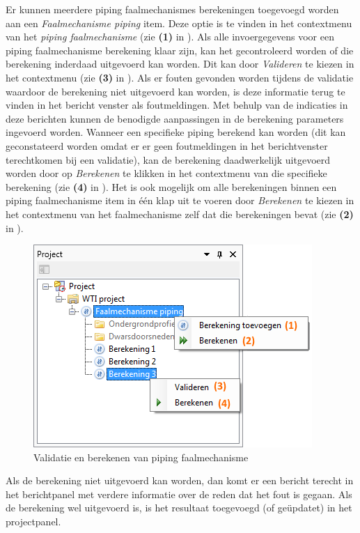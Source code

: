 \begin{enumerate}
\end{enumerate}


Er kunnen meerdere piping faalmechanismes berekeningen toegevoegd worden aan een \textit{Faalmechanisme piping} item. Deze optie is te vinden in het contextmenu van het \textit{piping faalmechanisme} (zie \textbf{(1)} in ).
Als alle invoergegevens voor een piping faalmechanisme berekening klaar zijn, kan het gecontroleerd worden of die berekening inderdaad uitgevoerd kan worden. Dit kan door \textit{Valideren} te kiezen in het contextmenu (zie \textbf{(3)} in ). Als er fouten gevonden worden tijdens de validatie waardoor de berekening niet uitgevoerd kan worden, is deze informatie terug te vinden in het bericht venster als foutmeldingen. Met behulp van de indicaties in deze berichten kunnen de benodigde aanpassingen in de berekening parameters ingevoerd worden. 
Wanneer een specifieke piping berekend kan worden (dit kan geconstateerd worden omdat er er geen foutmeldingen in het berichtvenster terechtkomen bij een validatie), kan de berekening daadwerkelijk uitgevoerd worden door op \textit{Berekenen} te klikken in het contextmenu van die specifieke berekening (zie \textbf{(4)} in ).
Het is ook mogelijk om alle berekeningen binnen een piping faalmechanisme item in één klap uit te voeren door \textit{Berekenen} te kiezen in het contextmenu van het faalmechanisme zelf dat die berekeningen bevat (zie \textbf{(2)} in ).

\begin{figure} [H]
	\centering
		\includegraphics{figures/chapter_piping/validateAndRunPiping}
	\caption{Validatie en berekenen van piping faalmechanisme}
	\label{fig:piping.validateAndRunPiping}
\end{figure}


Als de berekening niet uitgevoerd kan worden, dan komt er een bericht terecht in het berichtpanel met verdere informatie over de reden dat het fout is gegaan. Als de berekening wel uitgevoerd is, is het resultaat toegevoegd (of ge\"{u}pdatet) in het projectpanel.






